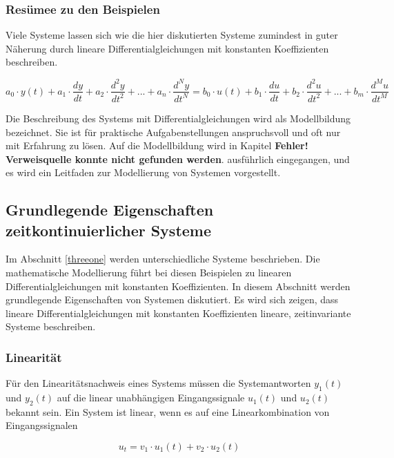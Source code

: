 \subsubsection{Resümee zu den Beispielen}
Viele Systeme lassen sich wie die hier diskutierten Systeme zumindest in guter Näherung durch lineare
Differentialgleichungen mit konstanten Koeffizienten beschreiben.

\begin{equation}\label{eq:threetwentyfive}
a_{0}\cdot y(t) + a_{1}\cdot \frac{dy}{dt}+a_{2}\cdot \frac{d^2y}{dt^2}+ ... +a_{n}\cdot \frac{d^Ny}{dt^N}=
b_{0}\cdot u(t) + b_{1}\cdot \frac{du}{dt}+b_{2}\cdot \frac{d^2u}{dt^2}+ ... +b_{m}\cdot \frac{d^Mu}{dt^M}
\end{equation}

\noindent Die Beschreibung des Systems mit Differentialgleichungen wird als Modellbildung bezeichnet. Sie ist für praktische Aufgabenstellungen anspruchsvoll und oft nur mit Erfahrung zu lösen. Auf die Modellbildung wird in Kapitel \textbf{Fehler! Verweisquelle konnte nicht gefunden werden}. ausführlich eingegangen, und es wird ein Leitfaden zur Modellierung von Systemen vorgestellt.


\subsection{Grundlegende Eigenschaften zeitkontinuierlicher Systeme} \label{threetwo}

Im Abschnitt \ref{threeone} werden unterschiedliche Systeme beschrieben. Die mathematische Modellierung führt bei diesen Beispielen zu linearen Differentialgleichungen mit konstanten Koeffizienten. In diesem Abschnitt werden grundlegende Eigenschaften von Systemen diskutiert. Es wird sich zeigen, dass lineare Differentialgleichungen mit konstanten Koeffizienten lineare, zeitinvariante Systeme beschreiben.

\subsubsection{Linearität}
Für den Linearitätsnachweis eines Systems müssen die Systemantworten $y_{1}(t)$ und $y_{2}(t)$ auf die linear unabhängigen Eingangssignale $u_{1}(t)$ und $u_{2}(t)$ bekannt sein. Ein System ist linear, wenn es auf eine Linearkombination von Eingangssignalen

\begin{equation}\label{eq:threetwentysix}
u_{t} = v_{1}\cdot u_{1}(t) +v_{2}\cdot u_{2}(t)
\end{equation}

